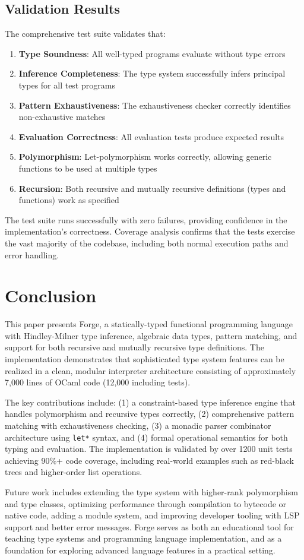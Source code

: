 \documentclass[conference,onecolumn]{IEEEtran}
\begin{document}
\subsection{Validation Results}

The comprehensive test suite validates that:

\begin{enumerate}
\item \textbf{Type Soundness}: All well-typed programs evaluate without type errors
\item \textbf{Inference Completeness}: The type system successfully infers principal types for all test programs
\item \textbf{Pattern Exhaustiveness}: The exhaustiveness checker correctly identifies non-exhaustive matches
\item \textbf{Evaluation Correctness}: All evaluation tests produce expected results
\item \textbf{Polymorphism}: Let-polymorphism works correctly, allowing generic functions to be used at multiple types
\item \textbf{Recursion}: Both recursive and mutually recursive definitions (types and functions) work as specified
\end{enumerate}

The test suite runs successfully with zero failures, providing confidence in the implementation's correctness. Coverage analysis confirms that the tests exercise the vast majority of the codebase, including both normal execution paths and error handling.

\newpage
\section{Conclusion}

This paper presents Forge, a statically-typed functional programming language with Hindley-Milner type inference, algebraic data types, pattern matching, and support for both recursive and mutually recursive type definitions. The implementation demonstrates that sophisticated type system features can be realized in a clean, modular interpreter architecture consisting of approximately 7,000 lines of OCaml code (12,000 including tests).

The key contributions include: (1) a constraint-based type inference engine that handles polymorphism and recursive types correctly, (2) comprehensive pattern matching with exhaustiveness checking, (3) a monadic parser combinator architecture using \texttt{let*} syntax, and (4) formal operational semantics for both typing and evaluation. The implementation is validated by over 1200 unit tests achieving 90\%+ code coverage, including real-world examples such as red-black trees and higher-order list operations.

Future work includes extending the type system with higher-rank polymorphism and type classes, optimizing performance through compilation to bytecode or native code, adding a module system, and improving developer tooling with LSP support and better error messages. Forge serves as both an educational tool for teaching type systems and programming language implementation, and as a foundation for exploring advanced language features in a practical setting.
\end{document}
